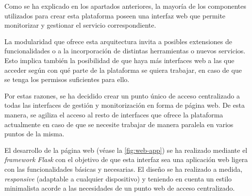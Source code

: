 Como se ha explicado en los apartados anteriores, la mayoría de los componentes utilizados para crear esta plataforma poseen una interfaz web que permite monitorizar y gestionar el servicio correspondiente.

La modularidad que ofrece esta arquitectura invita a posibles extensiones de funcionalidades o a la incorporación de distintas herramientas o nuevos servicios. Esto implica también la posibilidad de que haya más interfaces web a las que acceder según con qué parte de la plataforma se quiera trabajar, en caso de que se tenga los permisos suficientes para ello.

Por estas razones, se ha decidido crear un punto único de acceso centralizado a todas las interfaces de gestión y monitorización en forma de página web. De esta manera, se agiliza el acceso al resto de interfaces que ofrece la plataforma actualmente en caso de que se necesite trabajar de manera paralela en varios puntos de la misma.

El desarrollo de la página web (véase la \autoref{fig:web-app}) se ha realizado mediante el \textit{framework Flask} con el objetivo de que esta interfaz sea una aplicación web ligera con las funcionalidades básicas y necesarias. El diseño se ha realizado a medida, \textit{responsive} (adaptable a cualquier dispositivo) y teniendo en cuenta un estilo minimalista acorde a las necesidades de un punto web de acceso centralizado.

